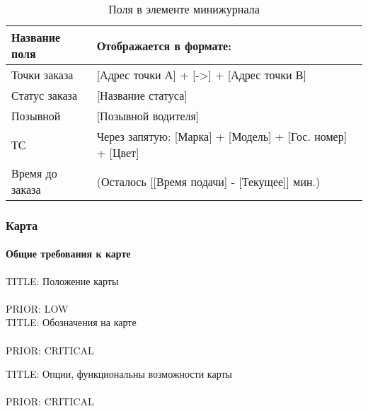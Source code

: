 		    \begin{table}
	            \begin{center}
	            \caption {Поля в элементе минижурнала}
	            \label{fields_element_minijournal}
	            \setlength{\extrarowheight}{2mm}
	            \begin{tabular}{|p{5cm}|p{10cm}|}
	               \hline     \textbf{Название поля}&\textbf{Отображается в формате:} \\ [2mm]

	               \hline Точки заказа  & [Адрес точки А] + [->] + [Адрес точки В]\\ [2mm]
	               \hline Статус заказа  & [Название статуса]\\ [2mm]
	               \hline Позывной    & [Позывной водителя]\\ [2mm]
	               \hline ТС & Через запятую: [Марка] + [Модель] + [Гос. номер] + [Цвет]\\ [2mm]
	               \hline Время до заказа  & (Осталось [[Время подачи] - [Текущее]] мин.)\\ [2mm]

	               \hline
	            \end{tabular}
	            \end{center}
            \end{table}


		\subsubsection{Карта}

			\paragraph{Общие требования к карте}	

				TITLE: Положение карты\\
				\\ 
				PRIOR: LOW\\

				TITLE: Обозначения на карте\\
				\\ 
				PRIOR: CRITICAL

				TITLE: Опции, функциональны возможности карты\\
				\\ 
				PRIOR: CRITICAL

